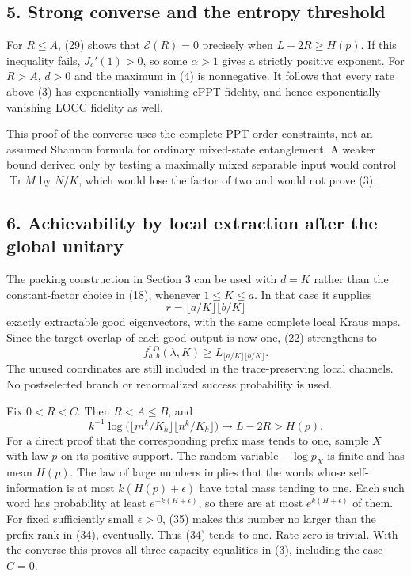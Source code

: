 \documentclass[11pt]{article}
\begin{document}
\hypertarget{strong-converse-and-the-entropy-threshold}{%
\subsection{5. Strong converse and the entropy threshold}\label{strong-converse-and-the-entropy-threshold}}

For \(R\le A\), (29) shows that \(\mathcal E(R)=0\) precisely when \(L-2R\ge H(p)\). If this inequality fails, \(J_c'(1)>0\), so some \(\alpha>1\) gives a strictly positive exponent. For \(R>A\), \(d>0\) and the maximum in (4) is nonnegative. It follows that every rate above (3) has exponentially vanishing cPPT fidelity, and hence exponentially vanishing LOCC fidelity as well.

This proof of the converse uses the complete-PPT order constraints, not an assumed Shannon formula for ordinary mixed-state entanglement. A weaker bound derived only by testing a maximally mixed separable input would control \(\operatorname{Tr}M\) by \(N/K\), which would lose the factor of two and would not prove (3).

\hypertarget{achievability-by-local-extraction-after-the-global-unitary}{%
\subsection{6. Achievability by local extraction after the global unitary}\label{achievability-by-local-extraction-after-the-global-unitary}}

The packing construction in Section 3 can be used with \(d=K\) rather than the constant-factor choice in (18), whenever \(1\le K\le a\). In that case it supplies \[
 r=\lfloor a/K\rfloor\lfloor b/K\rfloor
 \tag{33}
\] exactly extractable good eigenvectors, with the same complete local Kraus maps. Since the target overlap of each good output is now one, (22) strengthens to \[
 f_{a,b}^{\mathrm{LO}}(\lambda,K)\ge L_{\lfloor a/K\rfloor\lfloor b/K\rfloor}.
 \tag{34}
\] The unused coordinates are still included in the trace-preserving local channels. No postselected branch or renormalized success probability is used.

Fix \(0<R<C\). Then \(R<A\le B\), and \[
 k^{-1}\log\bigl(\lfloor m^k/K_k\rfloor\lfloor n^k/K_k\rfloor\bigr)
 \longrightarrow L-2R>H(p).
 \tag{35}
\] For a direct proof that the corresponding prefix mass tends to one, sample \(X\) with law \(p\) on its positive support. The random variable \(-\log p_X\) is finite and has mean \(H(p)\). The law of large numbers implies that the words whose self-information is at most \(k(H(p)+\epsilon)\) have total mass tending to one. Each such word has probability at least \(e^{-k(H+\epsilon)}\), so there are at most \(e^{k(H+\epsilon)}\) of them. For fixed sufficiently small \(\epsilon>0\), (35) makes this number no larger than the prefix rank in (34), eventually. Thus (34) tends to one. Rate zero is trivial. With the converse this proves all three capacity equalities in (3), including the case \(C=0\).
\end{document}

